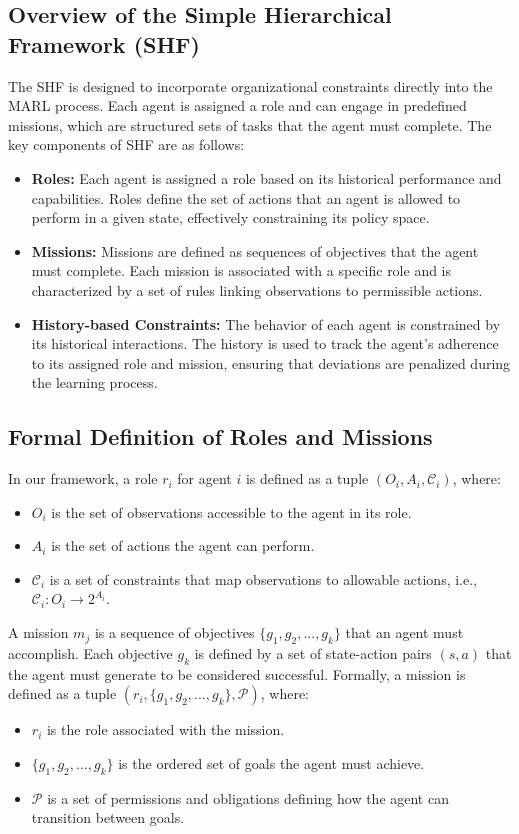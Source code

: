 \documentclass[sigconf,anonymous]{aamas}
\begin{document}
\subsection{Overview of the Simple Hierarchical Framework (SHF)}
The SHF is designed to incorporate organizational constraints directly into the MARL process. Each agent is assigned a role and can engage in predefined missions, which are structured sets of tasks that the agent must complete. The key components of SHF are as follows:

\begin{itemize}
    \item \textbf{Roles:} Each agent is assigned a role based on its historical performance and capabilities. Roles define the set of actions that an agent is allowed to perform in a given state, effectively constraining its policy space.
    \item \textbf{Missions:} Missions are defined as sequences of objectives that the agent must complete. Each mission is associated with a specific role and is characterized by a set of rules linking observations to permissible actions.
    \item \textbf{History-based Constraints:} The behavior of each agent is constrained by its historical interactions. The history is used to track the agent's adherence to its assigned role and mission, ensuring that deviations are penalized during the learning process.
\end{itemize}

\subsection{Formal Definition of Roles and Missions}
In our framework, a role $r_i$ for agent $i$ is defined as a tuple $(O_i, A_i, \mathcal{C}_i)$, where:
\begin{itemize}
    \item $O_i$ is the set of observations accessible to the agent in its role.
    \item $A_i$ is the set of actions the agent can perform.
    \item $\mathcal{C}_i$ is a set of constraints that map observations to allowable actions, i.e., $\mathcal{C}_i: O_i \rightarrow 2^{A_i}$.
\end{itemize}

A mission $m_j$ is a sequence of objectives $\{g_1, g_2, ..., g_k\}$ that an agent must accomplish. Each objective $g_k$ is defined by a set of state-action pairs $(s, a)$ that the agent must generate to be considered successful. Formally, a mission is defined as a tuple $(r_i, \{g_1, g_2, ..., g_k\}, \mathcal{P})$, where:
\begin{itemize}
    \item $r_i$ is the role associated with the mission.
    \item $\{g_1, g_2, ..., g_k\}$ is the ordered set of goals the agent must achieve.
    \item $\mathcal{P}$ is a set of permissions and obligations defining how the agent can transition between goals.
\end{itemize}
\end{document}
